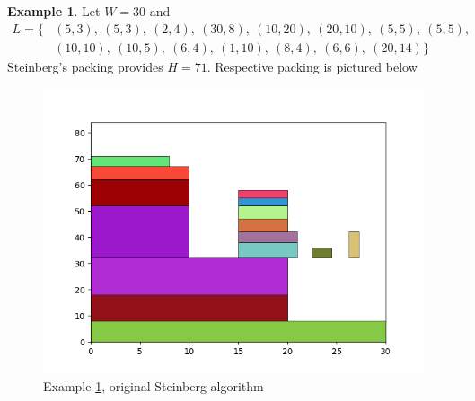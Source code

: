 \documentclass{article}
\theoremstyle{definition}
\newtheorem{example}{Example}
\theoremstyle{theorem}
\numberwithin{proposition}{section}
\begin{document}
    \begin{example}\label{ex3}
        Let $W = 30$ and 
        \begin{equation*}
            \begin{aligned}
            L = \{&(5, 3),~(5, 3),~(2, 4),~(30, 8),~(10, 20),~(20, 10),~(5, 5),~(5, 5),\\
                  &(10, 10),~(10, 5),~(6, 4),~(1, 10),~(8, 4),~(6, 6),~(20, 14)\}
            \end{aligned}
        \end{equation*} 
        Steinberg’s packing provides $H = 71$. Respective packing is pictured below
        \begin{figure}[H]
            \centering
            \includegraphics[scale=0.5]{../examples/original-3.png}
            \caption{Example \ref{ex3}, original Steinberg algorithm}
        \end{figure} 
    \end{example}
\end{document}
